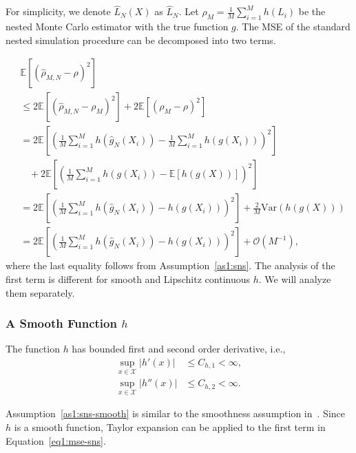 For simplicity, we denote $\hat{L}_N(X)$ as $\hat{L}_N$.
Let $\rho_M = \frac{1}{M} \sum_{i=1}^M h(L_i)$ be the nested Monte Carlo estimator with the true function $g$.
The MSE of the standard nested simulation procedure can be decomposed into two terms.

\begin{align} \label{eq1:mse-sns}
    & \mathbb{E} \left[ \left( \hat{\rho}_{M, N} - \rho \right)^2 \right] \nonumber \\
    & \leq 2 \mathbb{E} \left[ \left( \hat{\rho}_{M, N} - \rho_M \right)^2 \right] 
            + 2  \mathbb{E} \left[ \left(\rho_M - \rho \right)^2 \right]  \nonumber \\
    & = 2 \mathbb{E} \left[  \left( \frac{1}{M} \sum_{i=1}^M h\left( \hat{g}_{N}(X_i) \right) -  \frac{1}{M} \sum_{i=1}^M h\left(g(X_i) \right)  \right)^2\right] \nonumber \\
    & ~~~~ + 2  \mathbb{E} \left[ \left(\frac{1}{M} \sum_{i=1}^M h\left(g(X_i) \right) - \mathbb{E}\left[ h(g(X))\right] \right)^2 \right]  \nonumber \\
    & = 2 \mathbb{E} \left[  \left( \frac{1}{M} \sum_{i=1}^M h\left( \hat{g}_{N}(X_i) \right) -  h\left(g(X_i) \right)  \right)^2\right] + \frac{2}{M} \text{Var}(h(g(X))) \nonumber \\
    & = 2 \mathbb{E} \left[  \left( \frac{1}{M} \sum_{i=1}^M h\left( \hat{g}_{N}(X_i) \right) -  h\left(g(X_i) \right)  \right)^2\right] + \mathcal{O}(M^{-1}),
\end{align}
where the last equality follows from Assumption~\ref{as1:sns}.
The analysis of the first term is different for smooth and Lipschitz continuous $h$. 
We will analyze them separately.

\subsubsection*{A Smooth Function $h$}
\begin{assumption} \label{as1:sns-smooth}
    The function $h$ has bounded first and second order derivative, i.e.,
    \begin{align*}
        \sup_{x \in \mathcal{X}} |h'(x)|  & \leq C_{h, 1} < \infty, \\
        \sup_{x \in \mathcal{X}} |h''(x)| & \leq C_{h, 2} < \infty.
    \end{align*}
\end{assumption}
Assumption~\ref{as1:sns-smooth} is similar to the smoothness assumption in~\cite{wang2022smooth}.
Since $h$ is a smooth function, Taylor expansion can be applied to the first term in Equation~\ref{eq1:mse-sns}.

